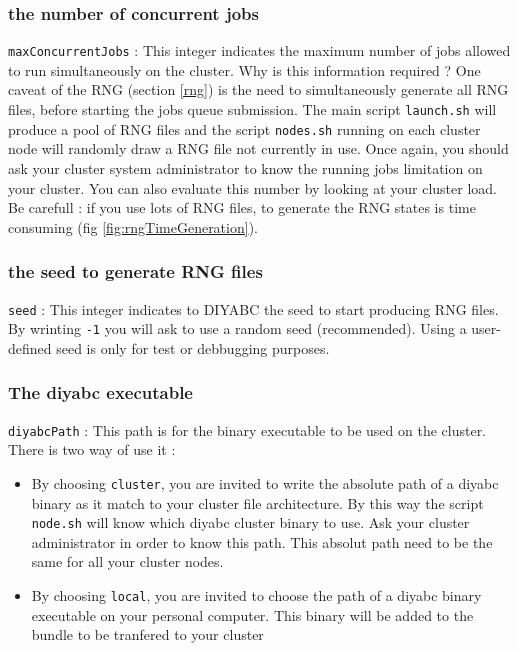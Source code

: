 \subsubsection{the number of concurrent jobs}
\texttt{maxConcurrentJobs} : This integer indicates the maximum number of jobs allowed to run simultaneously on the cluster. Why is this information required ? One caveat of the RNG (section \ref{rng}) is the need to simultaneously generate all RNG files, before starting the jobs queue submission. The main script \texttt{launch.sh} will produce a pool of RNG files and the script \texttt{nodes.sh} running on each cluster node will randomly draw a RNG file not currently in use. Once again, you should ask your cluster system administrator to know the running jobs limitation on your cluster. You can also evaluate this number by looking at your cluster load. Be carefull : if you use lots of RNG files, to generate the RNG states is time consuming (fig \ref{fig:rngTimeGeneration}).

\subsubsection{the seed to generate RNG files}
\texttt{seed} : This integer indicates to DIYABC the seed to start producing RNG files. By wrinting \texttt{-1} you will ask to use a random seed (recommended). Using a user-defined seed is only for test or debbugging purposes. 

\subsubsection{The diyabc executable}
\texttt{diyabcPath} : This path is for the binary executable to be used on the cluster. There is two way of use it :
\begin{itemize}
 \item  By choosing \texttt{cluster}, you are invited to write the absolute path of a diyabc binary as it match to your cluster file architecture. By this way the script \texttt{node.sh} will know which diyabc cluster binary to use. Ask your cluster administrator in order to know this path. This absolut path need to be the same for all your cluster nodes. 
 \item  By choosing \texttt{local}, you are invited to choose the path of a diyabc binary executable on your personal computer. This binary will be added to the bundle to be tranfered to your cluster
\end{itemize}


